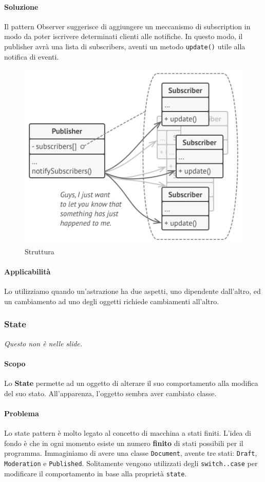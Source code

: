 \documentclass[11pt]{article}
\newcommand{\code}[1]{\texttt{#1}}
\begin{document}
\paragraph{Soluzione}
Il pattern Observer suggerisce di aggiungere un meccanismo di subscription in modo da poter iscrivere determinati clienti alle notifiche. In questo modo, il publisher avrà una lista di subscribers, aventi un metodo \code{update()} utile alla notifica di eventi. 
\begin{figure}[H]
    \includegraphics[width=\linewidth]{res/teoria/Observer.png}
    \caption{Struttura}
\end{figure}
\paragraph{Applicabilità}
Lo utilizziamo quando un'astrazione ha due aspetti, uno dipendente dall'altro, ed un cambiamento ad uno degli oggetti richiede cambiamenti all'altro. 

\subsubsection{State}
\textit{Questo non è nelle slide.}
\paragraph{Scopo}
Lo \textbf{State} permette ad un oggetto di alterare il suo comportamento alla modifica del suo stato. All'apparenza, l'oggetto sembra aver cambiato classe.
\paragraph{Problema}
Lo state pattern è molto legato al concetto di macchina a stati finiti. L'idea di fondo è che in ogni momento esiste un numero \textbf{finito} di stati possibili per il programma. Immaginiamo di avere una classe \code{Document}, avente tre stati: \code{Draft}, \code{Moderation} e \code{Published}. Solitamente vengono utilizzati degli \code{switch..case} per modificare il comportamento in base alla proprietà \code{state}.
\end{document}
